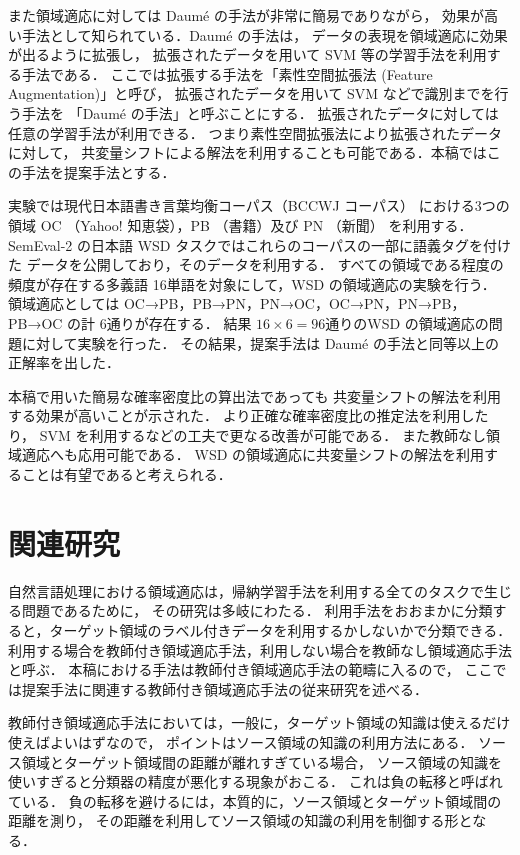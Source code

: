 \documentclass[japanese]{jnlp_1.4}
\begin{document}
また領域適応に対しては Daum{\'e} の手法\cite{daume0}が非常に簡易でありながら，
効果が高い手法として知られている．Daum{\'e} の手法は，
データの表現を領域適応に効果が出るように拡張し，
拡張されたデータを用いて SVM 等の学習手法を利用する手法である．
ここでは拡張する手法を「素性空間拡張法 (Feature Augmentation)」と呼び，
拡張されたデータを用いて SVM などで識別までを行う手法を
「Daum{\'e} の手法」と呼ぶことにする．
拡張されたデータに対しては任意の学習手法が利用できる．
つまり素性空間拡張法により拡張されたデータに対して，
共変量シフトによる解法を利用することも可能である．本稿ではこの手法を提案手法とする．


実験では現代日本語書き言葉均衡コーパス（BCCWJ コーパス\cite{bccwj}）
における3つの領域 OC （Yahoo! 知恵袋），PB （書籍）及び PN （新聞）
を利用する．SemEval-2 の日本語 WSD タスク\cite{semeval-2010}ではこれらのコーパスの一部に語義タグを付けた
データを公開しており，そのデータを利用する．
すべての領域である程度の頻度が存在する多義語 16単語を対象にして，WSD の領域適応の実験を行う．
領域適応としては OC→PB，PB→PN，PN→OC，OC→PN，PN→PB，PB→OC の計 6通りが存在する．
結果 \( 16 \times 6 = 96 \)通りのWSD の領域適応の問題に対して実験を行った．
その結果，提案手法は  Daum{\'e} の手法と同等以上の正解率を出した．

本稿で用いた簡易な確率密度比の算出法であっても
共変量シフトの解法を利用する効果が高いことが示された．
より正確な確率密度比の推定法を利用したり，
SVM を利用するなどの工夫で更なる改善が可能である．
また教師なし領域適応へも応用可能である．
WSD の領域適応に共変量シフトの解法を利用することは有望であると考えられる．


\section{関連研究}


自然言語処理における領域適応は，帰納学習手法を利用する全てのタスクで生じる問題であるために，
その研究は多岐にわたる．
利用手法をおおまかに分類すると，ターゲット領域のラベル付きデータを利用するかしないかで分類できる．
利用する場合を教師付き領域適応手法，利用しない場合を教師なし領域適応手法と呼ぶ．
本稿における手法は教師付き領域適応手法の範疇に入るので，
ここでは提案手法に関連する教師付き領域適応手法の従来研究を述べる．

教師付き領域適応手法においては，一般に，ターゲット領域の知識は使えるだけ使えばよいはずなので，
ポイントはソース領域の知識の利用方法にある．
ソース領域とターゲット領域間の距離が離れすぎている場合，
ソース領域の知識を使いすぎると分類器の精度が悪化する現象がおこる．
これは負の転移\cite{rosenstein2005transfer}と呼ばれている．
負の転移を避けるには，本質的に，ソース領域とターゲット領域間の距離を測り，
その距離を利用してソース領域の知識の利用を制御する形となる．
\end{document}
